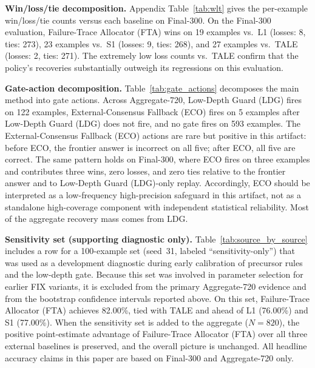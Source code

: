 \medskip\noindent\textbf{Win/loss/tie decomposition.}
Appendix Table~\ref{tab:wlt} gives the per-example win/loss/tie counts versus each baseline
on Final-300.
On the Final-300 evaluation, Failure-Trace Allocator (FTA) wins on 19 examples vs.\ L1 (losses: 8, ties: 273),
23 examples vs.\ S1 (losses: 9, ties: 268), and 27 examples vs.\ TALE (losses: 2, ties: 271).
The extremely low loss counts vs.\ TALE confirm that the policy's recoveries
substantially outweigh its regressions on this evaluation.

\medskip\noindent\textbf{Gate-action decomposition.}
Table~\ref{tab:gate_actions} decomposes the main method into gate actions.
Across Aggregate-720, Low-Depth Guard (LDG) fires on 122 examples, External-Consensus Fallback (ECO) fires on 5 examples after
Low-Depth Guard (LDG) does not fire, and no gate fires on 593 examples.
The External-Consensus Fallback (ECO) actions are rare but positive in this artifact: before ECO, the
frontier answer is incorrect on all five; after ECO, all five are correct.
The same pattern holds on Final-300, where ECO fires on three examples and
contributes three wins, zero losses, and zero ties relative to the frontier answer
and to Low-Depth Guard (LDG)-only replay.
Accordingly, ECO should be interpreted as a low-frequency high-precision safeguard in
this artifact, not as a standalone high-coverage component with independent statistical reliability.
Most of the aggregate recovery mass comes from LDG.

\medskip\noindent\textbf{Sensitivity set (supporting diagnostic only).}
Table~\ref{tab:source_by_source} includes a row for a 100-example set (seed~31,
labeled ``sensitivity-only'') that was used as a development diagnostic during
early calibration of precursor rules and the low-depth gate.
Because this set was involved in parameter selection for earlier FIX variants,
it is excluded from the primary Aggregate-720 evidence and from the bootstrap
confidence intervals reported above.
On this set, Failure-Trace Allocator (FTA) achieves 82.00\%, tied with TALE and ahead of L1 (76.00\%)
and S1 (77.00\%).
When the sensitivity set is added to the aggregate ($N = 820$), the positive
point-estimate advantage of Failure-Trace Allocator (FTA) over all three external baselines is
preserved, and the overall picture is unchanged.
All headline accuracy claims in this paper are based on Final-300 and Aggregate-720
only.
